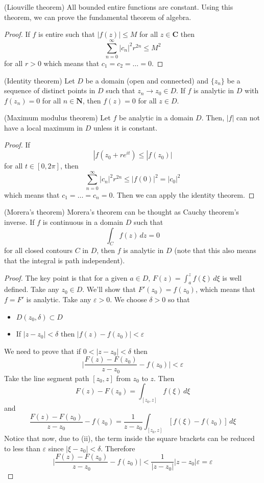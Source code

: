 \vspace{2ex}
\begin{cor}
(Liouville theorem) All bounded entire functions are constant. Using this theorem, we can prove the fundamental theorem of algebra.
\end{cor}
\vspace{2ex}
\begin{proof}
If $f$ is entire such that $|f(z)|\leq M$ for all $z\in {\bm C}$ then 
\[\sum ^{\infty }_{n=0}|c_{n}|^2r^{2n}\leq M^2\]
for all $r>0$ which means that $c_1=c_2=\ldots =0$. 
\end{proof}
\vspace{2ex}
\begin{thm}
(Identity theorem) Let $D$ be a domain (open and connected) and $\{z_{n}\}$ be a sequence of distinct points in $D$ such that $z_{n}\rightarrow z_0\in D$. If $f$ is analytic in $D$ with $f(z_{n})=0$ for all $n\in {\bm N}$, then $f(z)=0$ for all $z\in D$. 
\end{thm}
\vspace{2ex}
\begin{thm}
(Maximum modulus theorem) Let $f$ be analytic in a domain $D$. Then, $|f|$ can not have a local maximum in $D$ unless it is constant.
\end{thm}
\vspace{2ex}
\begin{proof}
If 
\[|f(z_0+re^{it})\leq |f(z_0)|\]
for all $t\in [0,2\pi ]$, then
\[\sum _{n=0}^{\infty }|c_{n}|^2r^{2n}\leq |f(0)|^2=|c_0|^2\]
which means that $c_1=\ldots= c_{n}=0$. Then we can apply the identity theorem.
\end{proof}
\vspace{2ex}
\begin{thm}
(Morera's theorem) Morera's theorem can be thought as Cauchy theorem's inverse. If $f$ is continuous in a domain $D$ such that \[\int _{C}f(z)\,dz=0\]
for all closed contours $C$ in $D$, then $f$ is analytic in $D$ (note that this also means that the integral is path independent).
\end{thm}
\vspace{2ex}
\begin{proof}
The key point is that for a given $a\in D$, $F(z)=\int ^{z}_{a}f(\xi )\,d\xi $ is well defined. Take any $z_0\in D$. We'll show that $F'(z_0)=f(z_0)$, which means that $f=F'$ is analytic. Take any $\varepsilon >0$. We choose $\delta >0$ so that
\begin{itemize}
\item[(i)] $D(z_0,\delta )\subset D$
\item[(ii)] If $|z-z_0|<\delta $ then $|f(z)-f(z_0)|<\varepsilon $
\end{itemize}
We need to prove that if $0<|z-z_0|<\delta $ then 
\[\Big|\dfrac{F(z)-F(z_0)}{z-z_0}-f(z_0)\Big|<\varepsilon \]
Take the line segment path $[z_0,z]$ from $z_0$ to $z$. Then
\[F(z)-F(z_0)=\int _{[z_0,z]}f(\xi )\,d\xi \]
and
\[\dfrac{F(z)-F(z_0)}{z-z_0}-f(z_0)=\dfrac{1}{z-z_0}\int _{[z_0,z]}[f(\xi )-f(z_0)]\,d\xi \]
Notice that now, due to (ii), the term inside the square brackets can be reduced to less than $\varepsilon $ since $|\xi -z_0|<\delta $. Therefore
\[\Big|\dfrac{F(z)-F(z_0)}{z-z_0}-f(z_0)\Big|<\dfrac{1}{|z-z_0|}|z-z_0|\varepsilon =\varepsilon \]
\end{proof}
